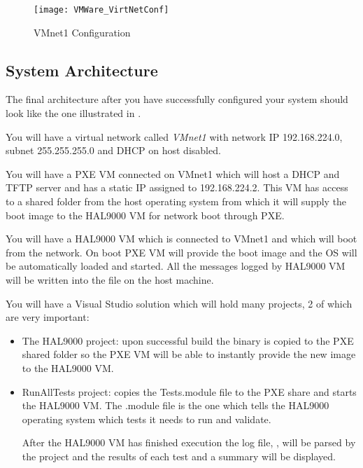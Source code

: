 \begin{appendices}
\begin{enumerate}
\begin{figure}
	\centering
	\texttt{[image: VMWare\_VirtNetConf]}
		\caption{VMnet1 Configuration}
	\label{fig:VmWareVirtNetConf}
\end{figure}

\end{enumerate}

\subsection{System Architecture}

The final architecture after you have successfully configured your system should look like the one
illustrated in .

You will have a virtual network called \textit{VMnet1} with network IP 192.168.224.0, subnet
255.255.255.0 and DHCP on host disabled.

You will have a PXE VM connected on VMnet1 which will host a DHCP and TFTP server and has a static
IP assigned to 192.168.224.2. This VM has access to a shared folder from the host operating system
from which it will supply the boot image to the HAL9000 VM for network boot through PXE.

You will have a HAL9000 VM which is connected to VMnet1 and which will boot from the network. On
boot PXE VM will provide the boot image and the OS will be automatically loaded and started. All
the messages logged by HAL9000 VM will be written into the  file on the host
machine.

You will have a Visual Studio solution which will hold many projects, 2 of which are very important:
\begin{itemize}
	\item The HAL9000 project: upon successful build the binary is copied to the PXE shared folder
so the PXE VM will be able to instantly provide the new image to the HAL9000 VM.

	\item RunAllTests project: copies the Tests.module file to the PXE share and starts the HAL9000
VM. The .module file is the one which tells the HAL9000 operating system which tests it needs to run
and validate.

	After the HAL9000 VM has finished execution the log file, , will be parsed by
the project and the results of each test and a summary will be displayed.
\end{itemize}


\end{appendices}

